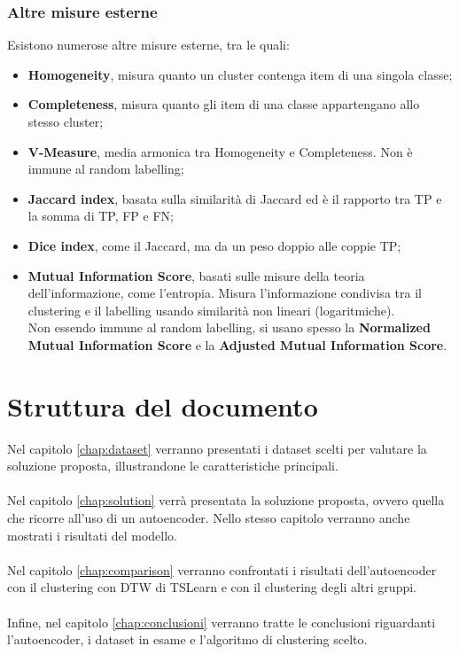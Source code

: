 \subsubsection{Altre misure esterne}
Esistono numerose altre misure esterne, tra le quali:
\begin{itemize}
	\item \textbf{Homogeneity}, misura quanto un cluster contenga item di una singola classe;
	\item \textbf{Completeness}, misura quanto gli item di una classe appartengano allo stesso cluster;
	\item \textbf{V-Measure}, media armonica tra Homogeneity e Completeness. Non è immune al random labelling;
	\item \textbf{Jaccard index}, basata sulla similarità di Jaccard ed è il rapporto tra TP e la somma di TP, FP e FN;
	\item \textbf{Dice index}, come il Jaccard, ma da un peso doppio alle coppie TP;
	\item \textbf{Mutual Information Score}, basati sulle misure della teoria dell'informazione, come l'entropia. Misura l'informazione condivisa tra il clustering e il labelling usando similarità non lineari (logaritmiche).\\
	Non essendo immune al random labelling, si usano spesso la \textbf{Normalized Mutual Information Score} e la \textbf{Adjusted Mutual Information Score}.
\end{itemize}

\section{Struttura del documento}
Nel capitolo \ref{chap:dataset} verranno presentati i dataset scelti per valutare la soluzione proposta, illustrandone le caratteristiche principali.\\
\\
Nel capitolo \ref{chap:solution} verrà presentata la soluzione proposta, ovvero quella che ricorre all'uso di un autoencoder. Nello stesso capitolo verranno anche mostrati i risultati del modello.\\
\\
Nel capitolo \ref{chap:comparison} verranno confrontati i risultati dell'autoencoder con il clustering con DTW di TSLearn e con il clustering degli altri gruppi.\\
\\
Infine, nel capitolo \ref{chap:conclusioni} verranno tratte le conclusioni riguardanti l'autoencoder, i dataset in esame e l'algoritmo di clustering scelto.\\